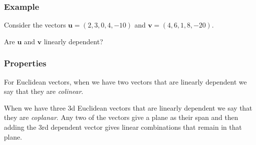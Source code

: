\documentclass[usenames,dvipsnames,aspectratio=169,10pt]{beamer}
\numberwithin{equation}{section}
\begin{document}
\begin{frame}
\frametitle{Example}

Consider the vectors $\mathbf{u}=(2,3,0,4,-10)$ and $\mathbf{v}=(4,6,1,8,-20)$.

Are $\mathbf{u}$ and $\mathbf{v}$ linearly dependent?
\end{frame}
\fi 


\begin{frame}
\frametitle{Properties}

\begin{minipage}{0.55\textwidth}
For Euclidean vectors, when we have two vectors that are linearly dependent we say that they are \textit{colinear}.
\end{minipage}
\begin{minipage}{0.4\textwidth}
\begin{figure}[H]
\begin{center}
\end{center}
\end{figure}
\end{minipage}



\begin{minipage}{0.55\textwidth}
When we have three 3d Euclidean vectors that are linearly dependent we say that they are \textit{coplanar}. Any two of the vectors give a plane as their span and then adding the 3rd dependent vector gives linear combinations that remain in that plane.
\end{minipage}
\begin{minipage}{0.4\textwidth}
\begin{figure}[H]
\begin{center}
    \begin{tikzpicture}[line cap=round, line join=round, >=Triangle,scale=0.8]


\end{tikzpicture}
\end{center}
\end{figure}
\end{minipage}
\end{frame}
\end{document}
